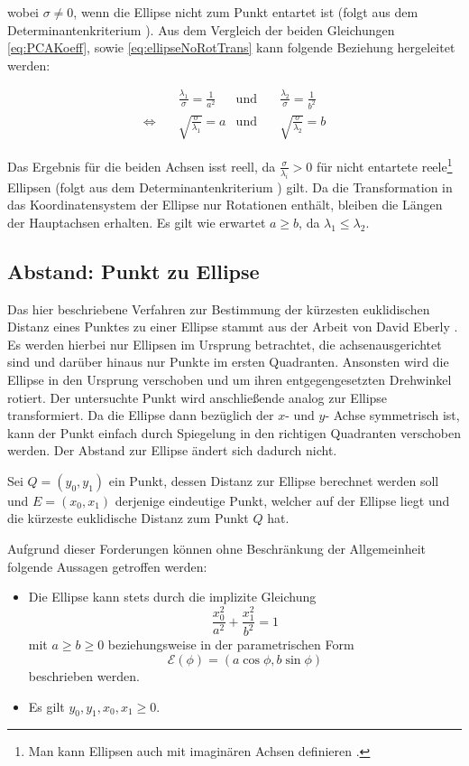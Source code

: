 wobei $\sigma \neq 0$, wenn die Ellipse nicht zum Punkt entartet ist (folgt aus dem Determinantenkriterium \cite{Lawrence1972}). Aus dem Vergleich der beiden Gleichungen \ref{eq:PCAKoeff}, sowie \ref{eq:ellipseNoRotTrans} kann folgende Beziehung hergeleitet werden:

\begin{equation}
\begin{aligned}
&\frac{\lambda_1}{\sigma} = \frac{1}{a^2} &\text{und}\quad &\frac{\lambda_2}{\sigma} = \frac{1}{b^2}\\
\Leftrightarrow\quad & \sqrt{\frac{\sigma}{\lambda_1}}  = a  &\text{und}\quad & \sqrt{\frac{\sigma}{\lambda_2}}  = b
\end{aligned}
\end{equation}

Das Ergebnis für die beiden Achsen isst reell, da $\frac{\sigma}{\lambda_i} > 0$ für nicht entartete reele\footnote{Man kann Ellipsen auch mit imaginären Achsen definieren \cite{Lawrence1972}.}  Ellipsen (folgt aus dem Determinantenkriterium \cite{Lawrence1972}) gilt. Da die Transformation in das Koordinatensystem der Ellipse nur Rotationen enthält,  bleiben die Längen der Hauptachsen erhalten. Es gilt wie erwartet $a \geq b$, da $\lambda_1 \leq \lambda_2$.


\subsection{Abstand: Punkt zu Ellipse}
\label{sc:distPointEllipse}
Das hier beschriebene Verfahren zur Bestimmung der kürzesten euklidischen Distanz eines Punktes zu einer Ellipse stammt aus der Arbeit von David Eberly \cite{Eberly2013}.
Es werden hierbei nur Ellipsen im Ursprung betrachtet, die achsenausgerichtet sind und darüber hinaus nur Punkte im ersten Quadranten. Ansonsten wird die Ellipse in den Ursprung verschoben und um ihren entgegengesetzten Drehwinkel rotiert.
Der untersuchte Punkt wird anschließende analog zur Ellipse transformiert.
Da die Ellipse dann bezüglich der $x$- und $y$- Achse symmetrisch ist, kann der Punkt einfach durch Spiegelung in den richtigen Quadranten verschoben werden. Der Abstand zur Ellipse ändert sich dadurch nicht.

Sei $Q = (y_0, y_1)$ ein Punkt, dessen Distanz zur Ellipse berechnet werden soll und $E = (x_0, x_1)$ derjenige eindeutige Punkt, welcher auf der Ellipse liegt und die kürzeste euklidische Distanz zum Punkt $Q$ hat.

Aufgrund dieser Forderungen können ohne Beschränkung der Allgemeinheit folgende Aussagen getroffen werden:
\begin{itemize}
	\item Die Ellipse kann stets durch die implizite Gleichung
	\begin{equation}\label{eq:distEqParam} \frac{x_0^2}{a^2} + \frac{x_1^2}{b^2} = 1\end{equation}
	 mit $a \geq b \geq 0$ beziehungsweise
	in der parametrischen Form \[\mathcal{E}(\phi) = (a\cos\phi, b\sin\phi)  \tag*{$\phi \in [0, 2\pi)$}\] beschrieben werden.
	\item Es gilt $y_0,y_1,x_0, x_1 \geq 0$.
\end{itemize}

